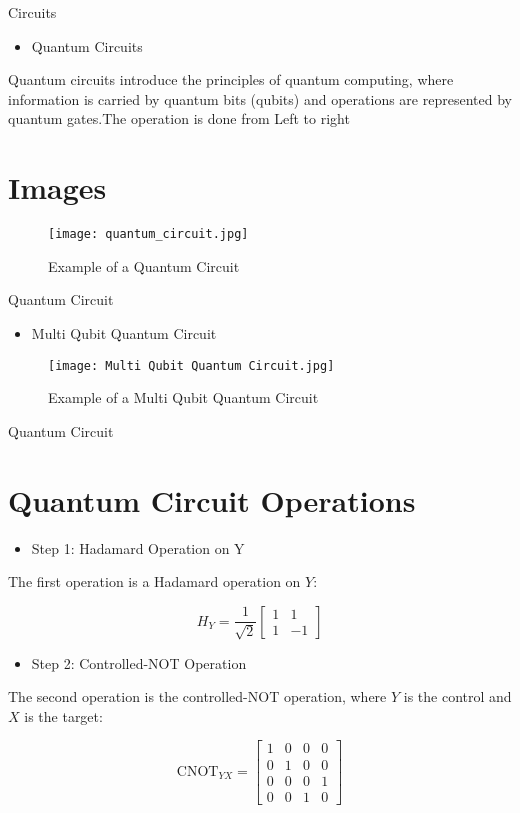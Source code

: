 \documentclass[12pt, aspectratio=169]{beamer}
\begin{document}
\begin{frame}{Circuits}
\begin{itemize}
  \item{ Quantum Circuits}
\end{itemize}

Quantum circuits introduce the principles of quantum computing, where information is carried by quantum bits (qubits) and operations are represented by quantum gates.The operation is done from Left to right

\section*{Images}


\begin{figure}[h]
    \centering
    \texttt{[image: quantum\_circuit.jpg]}
    \caption{Example of a Quantum Circuit}
    \label{fig:quantum_circuit}
\end{figure}
\end{frame}
\begin{frame}{Quantum Circuit}
\begin{itemize}
\item{Multi Qubit Quantum Circuit}
\end{itemize}
\begin{figure}[h]
    \centering
    \texttt{[image: Multi Qubit Quantum Circuit.jpg]}
    \caption{Example of a Multi Qubit Quantum Circuit}
    \label{fig:Multi Qubit Quantum Circuit}
\end{figure}
\end{frame}
\begin{frame}{Quantum Circuit}

\section*{Quantum Circuit Operations}
\begin{itemize}
\item{Step 1: Hadamard Operation on Y}
\end{itemize}
The first operation is a Hadamard operation on \(Y\):

\[
H_Y = \frac{1}{\sqrt{2}} \begin{bmatrix}
1 & 1 \\
1 & -1
\end{bmatrix}
\]
\begin{itemize}
\item{Step 2: Controlled-NOT Operation}
\end{itemize}
The second operation is the controlled-NOT operation, where \(Y\) is the control and \(X\) is the target:

\[
\text{CNOT}_{YX} = \begin{bmatrix}
1 & 0 & 0 & 0 \\
0 & 1 & 0 & 0 \\
0 & 0 & 0 & 1 \\
0 & 0 & 1 & 0
\end{bmatrix}
\]
\end{frame}
\end{document}
